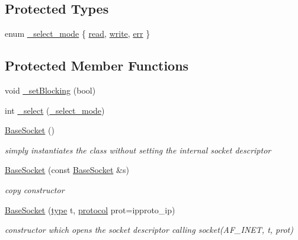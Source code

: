 \subsection*{Protected Types}
\begin{CompactItemize}
\item 
enum \hyperlink{classsocketpp_1_1BaseSocket_21492d478c5aa2ff8a1ad258ccf58062}{\_\-select\_\-mode} \{ \hyperlink{classsocketpp_1_1BaseSocket_21492d478c5aa2ff8a1ad258ccf580624782d25091b1ee2cda4f94b131593ce6}{read}, 
\hyperlink{classsocketpp_1_1BaseSocket_21492d478c5aa2ff8a1ad258ccf58062a19a7e61ac1d2a5dcb0efb4f71795685}{write}, 
\hyperlink{classsocketpp_1_1BaseSocket_21492d478c5aa2ff8a1ad258ccf58062401c7b14b3583749a9a5234ff43cb1c4}{err}
 \}
\subsection*{Protected Member Functions}
\begin{CompactItemize}
\item 
void \hyperlink{classsocketpp_1_1BaseSocket_4d49273453cf67218a89065bba9088c4}{\_\-setBlocking} (bool)
\item 
int \hyperlink{classsocketpp_1_1BaseSocket_c4063c52772810a38922b56c81e4b4d2}{\_\-select} (\hyperlink{classsocketpp_1_1BaseSocket_21492d478c5aa2ff8a1ad258ccf58062}{\_\-select\_\-mode})
\item 
\hyperlink{classsocketpp_1_1BaseSocket_3eb81ecbf94ce83afa6b2f60206c77f2}{BaseSocket} ()
\begin{CompactList}\small\item\em simply instantiates the class without setting the internal socket descriptor \item\end{CompactList}\item 
\hyperlink{classsocketpp_1_1BaseSocket_0c142db99422572579c91f3e176035c6}{BaseSocket} (const \hyperlink{classsocketpp_1_1BaseSocket}{BaseSocket} \&s)
\begin{CompactList}\small\item\em copy constructor \item\end{CompactList}\item 
\hyperlink{classsocketpp_1_1BaseSocket_35c982d7aef2041c100439cf38aa7f4d}{BaseSocket} (\hyperlink{namespacesocketpp_635f4c3b3f85aba331587404d59ae52d}{type} t, \hyperlink{namespacesocketpp_2969678def1c6c8cb4102802ca82e2cf}{protocol} prot=ipproto\_\-ip)
\begin{CompactList}\small\item\em constructor which opens the socket descriptor calling socket(AF\_\-INET, t, prot) \item\end{CompactList}\item 

\end{CompactItemize}
\end{CompactItemize}
